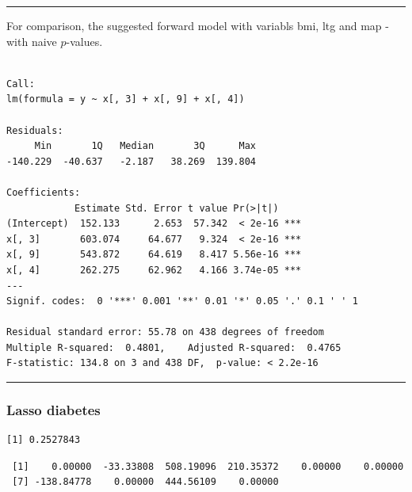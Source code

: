 \documentclass[
  letterpaper,
  DIV=11,
  numbers=noendperiod]{scrartcl}
\begin{document}
\begin{center}\rule{0.5\linewidth}{0.5pt}\end{center}

For comparison, the suggested forward model with variabls bmi, ltg and
map - with naive \(p\)-values.

\footnotesize

\begin{verbatim}

Call:
lm(formula = y ~ x[, 3] + x[, 9] + x[, 4])

Residuals:
     Min       1Q   Median       3Q      Max 
-140.229  -40.637   -2.187   38.269  139.804 

Coefficients:
            Estimate Std. Error t value Pr(>|t|)    
(Intercept)  152.133      2.653  57.342  < 2e-16 ***
x[, 3]       603.074     64.677   9.324  < 2e-16 ***
x[, 9]       543.872     64.619   8.417 5.56e-16 ***
x[, 4]       262.275     62.962   4.166 3.74e-05 ***
---
Signif. codes:  0 '***' 0.001 '**' 0.01 '*' 0.05 '.' 0.1 ' ' 1

Residual standard error: 55.78 on 438 degrees of freedom
Multiple R-squared:  0.4801,    Adjusted R-squared:  0.4765 
F-statistic: 134.8 on 3 and 438 DF,  p-value: < 2.2e-16
\end{verbatim}

\begin{center}\rule{0.5\linewidth}{0.5pt}\end{center}

\normalsize

\hypertarget{lasso-diabetes}{%
\subsubsection{Lasso diabetes}\label{lasso-diabetes}}

\footnotesize

\begin{verbatim}
[1] 0.2527843
\end{verbatim}

\begin{verbatim}
 [1]    0.00000  -33.33808  508.19096  210.35372    0.00000    0.00000
 [7] -138.84778    0.00000  444.56109    0.00000
\end{verbatim}
\end{document}
